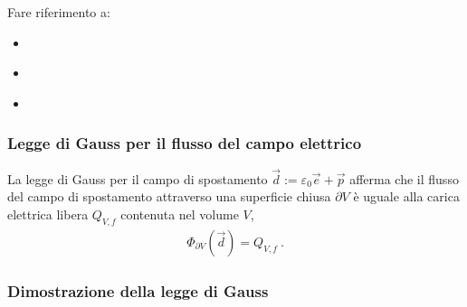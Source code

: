 \documentclass[letterpaper,10pt,italian]{jupyterBook}
\begin{document}
\sphinxAtStartPar
Fare riferimento a:
\begin{itemize}
\item {} 
\sphinxAtStartPar
{\hyperref[\detokenize{ch/electromagnetism/electrostatics:physics-hs-electromagnetism-electrostatics-maxwell}]{}}

\item {} 
\sphinxAtStartPar
{\hyperref[\detokenize{ch/electromagnetism/electromagnetism-steady:physics-hs-electromagnetism-electromagnetism-steady-maxwell}]{}}

\item {} 
\sphinxAtStartPar
{\hyperref[\detokenize{ch/electromagnetism/electromagnetism-general:physics-hs-electromagnetism-electromagnetism-general-maxwell}]{}}

\end{itemize}


\subsubsection{Legge di Gauss per il flusso del campo elettrico}
\label{\detokenize{ch/electromagnetism/electrostatics:legge-di-gauss-per-il-flusso-del-campo-elettrico}}\label{\detokenize{ch/electromagnetism/electrostatics:physics-hs-electromagnetism-electrostatics-maxwell-gauss}}
\sphinxAtStartPar
La legge di Gauss per il campo di spostamento \(\vec{d} := \varepsilon_0 \vec{e} + \vec{p}\) afferma che il flusso del campo di spostamento attraverso una superficie chiusa \(\partial V\) è uguale alla carica elettrica libera \(Q_{V,f}\) contenuta nel volume \(V\),
\begin{equation*}
\begin{split}\Phi_{\partial V}(\vec{d}) = Q_{V,f} \ .\end{split}
\end{equation*}\subsubsection*{Dimostrazione della legge di Gauss}
\end{document}
